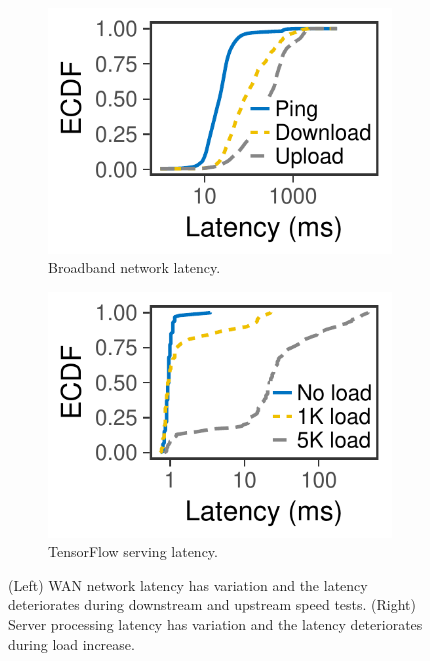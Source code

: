 \begin{figure}
  \centering
  \begin{subfigure}[t]{0.4\columnwidth}
    \centering
    \includegraphics[width=\textwidth]{figures/fcc_latency.pdf}
    \caption{Broadband network latency.}
    \label{fig:fcc-latency}
  \end{subfigure}
  \hspace{2em}
  \begin{subfigure}[t]{0.4\columnwidth}
    \centering
    \includegraphics[width=\textwidth]{figures/tf_latency.pdf}
    \caption{TensorFlow serving latency.}
    \label{fig:tf-latency}
  \end{subfigure}
  \caption{(Left) WAN network latency has variation and the latency deteriorates
    during downstream and upstream speed tests. (Right) Server processing
    latency has variation and the latency deteriorates during load increase.}
\end{figure}

